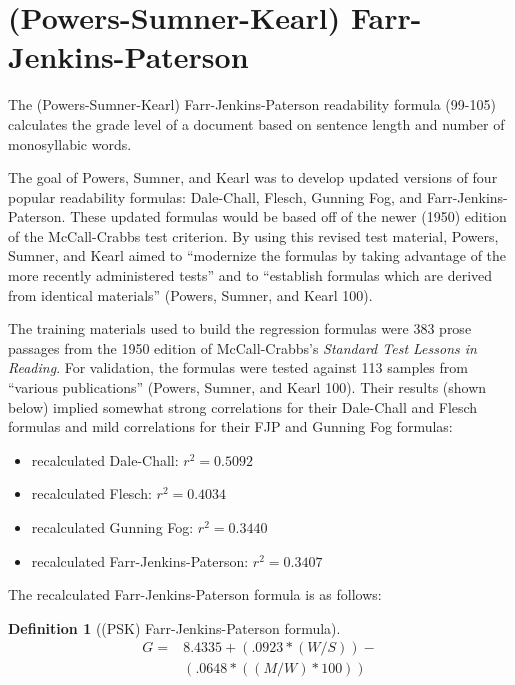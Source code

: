 \documentclass[
]{book}
\providecommand{\tightlist}{%
  \setlength{\itemsep}{0pt}\setlength{\parskip}{0pt}}
\theoremstyle{definition}
\newtheorem{definition}{Definition}[chapter]
\theoremstyle{definition}
\theoremstyle{definition}
\theoremstyle{definition}
\theoremstyle{remark}
\begin{document}
\newpage

\hypertarget{psk-farr-jenkins-paterson}{%
\section{\texorpdfstring{(Powers-Sumner-Kearl) Farr-Jenkins-Paterson}{(Powers-Sumner-Kearl) Farr-Jenkins-Paterson}}\label{psk-farr-jenkins-paterson}}

The (Powers-Sumner-Kearl) Farr-Jenkins-Paterson readability formula (99-105) calculates the grade level of a document based on sentence length and number of monosyllabic words.

The goal of Powers, Sumner, and Kearl was to develop updated versions of four popular readability formulas: Dale-Chall, Flesch, Gunning Fog, and Farr-Jenkins-Paterson. These updated formulas would be based off of the newer (1950) edition of the McCall-Crabbs test criterion. By using this revised test material, Powers, Sumner, and Kearl aimed to ``modernize the formulas by taking advantage of the more recently administered tests'' and to ``establish formulas which are derived from identical materials'' (Powers, Sumner, and Kearl 100).

The training materials used to build the regression formulas were 383 prose passages from the 1950 edition of McCall-Crabbs's \emph{Standard Test Lessons in Reading}. For validation, the formulas were tested against 113 samples from ``various publications'' (Powers, Sumner, and Kearl 100). Their results (shown below) implied somewhat strong correlations for their Dale-Chall and Flesch formulas and mild correlations for their FJP and Gunning Fog formulas:

\begin{itemize}
\tightlist
\item
  recalculated Dale-Chall: \(r^2 = 0.5092\)
\item
  recalculated Flesch: \(r^2 = 0.4034\)
\item
  recalculated Gunning Fog: \(r^2 = 0.3440\)
\item
  recalculated Farr-Jenkins-Paterson: \(r^2 = 0.3407\)
\end{itemize}

The recalculated Farr-Jenkins-Paterson formula is as follows:

\begin{definition}[(PSK) Farr-Jenkins-Paterson formula]
\protect\hypertarget{def:pskfjp}{}{\label{def:pskfjp} {} }\begin{align*}
  G = & 8.4335 + (.0923*(W/S)) - \\
      & (.0648*((M/W)*100))
\end{align*}
\end{definition}
\end{document}
